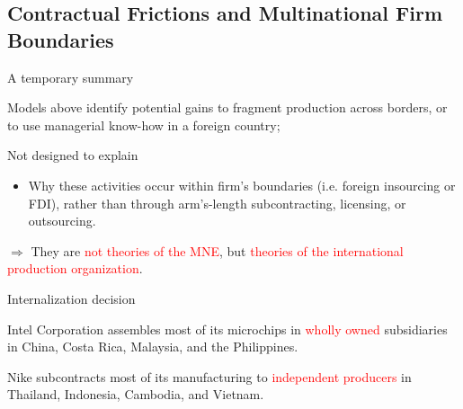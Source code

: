 \documentclass{beamer}
\begin{document}
\subsection{Contractual Frictions and Multinational Firm Boundaries}
\begin{frame}[shrink]
	\transfade %
	\tableofcontents[sectionstyle=show/shaded,subsectionstyle=show/shaded/hide]
	\addtocounter{framenumber}{-1}
\end{frame}
\begin{frame}{A temporary summary}
	\begin{block}{}
		Models above identify potential gains to fragment production across borders, or to use managerial know-how in a foreign country;
	\end{block}
	\begin{block}{}
		Not designed to explain
		\begin{itemize}
			\item Why these activities occur within firm's boundaries (i.e. foreign insourcing or FDI), rather than through arm's-length subcontracting, licensing, or outsourcing.
		\end{itemize}
	\end{block}
	\medskip
	$\Rightarrow$ They are \textcolor{red}{not theories of the MNE}, but \textcolor{red}{theories of the international production organization}.
\end{frame}
\begin{frame}{Internalization decision}
	\begin{block}{}
		Intel Corporation assembles most of its microchips in \textcolor{red}{wholly owned} subsidiaries in China, Costa Rica, Malaysia, and the Philippines.
	\end{block}
	\begin{block}{}
		Nike subcontracts most of its manufacturing to \textcolor{red}{independent producers} in Thailand, Indonesia, Cambodia, and Vietnam.
	\end{block}
\end{frame}
\end{document}
